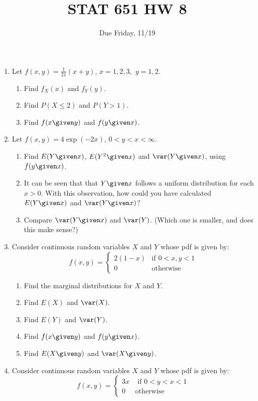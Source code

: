 \documentclass[12pt]{article}
\begin{document}
\title{STAT 651 HW 8}
\author{Due Friday, 11/19}
\date{}
\maketitle

\begin{enumerate}
\item Let $f(x,y) = \frac{1}{21}(x+y)$, $x=1,2,3,$ $y=1,2$.
 \begin{enumerate}
 \item Find $f_X(x)$ and $f_Y(y)$.
 \item Find $P(X\le 2)$ and $P(Y>1)$.
 \item Find $f(x\given y)$ and $f(y\given x)$.
 \end{enumerate}

\item Let $f(x,y) = 4\exp(-2x)$, $0<y<x<\infty$.
  \begin{enumerate}
  \item Find $E(Y\given x)$, $E(Y^2\given x)$ and $\var(Y\given x)$,
  using $f(y\given x)$.
  \item It can be seen that that $Y\given x$ follows a uniform distribution for each $x>0$.
  With this observation, how could you have calculated $E(Y\given x)$ and
  $\var(Y\given x)$?
  \item Compare $\var(Y\given x)$ and $\var(Y)$.  (Which one is smaller, and does this make sense?)
  \end{enumerate}

\item Consider continuous random variables $X$ and $Y$ whose pdf is given by:
\[
f(x,y) = \begin{cases}
    2(1-x)  & \text{if $0 < x,y < 1$} \\
    0       & \text{otherwise}
    \end{cases}
\]

  \begin{enumerate}
  \item Find the marginal distributions for $X$ and $Y$.
  \item Find $E(X)$ and $\var(X)$.
  \item Find $E(Y)$ and $\var(Y)$.
  \item Find $f(x\given y)$ and $f(y\given x)$.
  \item Find $E(X\given y)$ and $\var(X\given y)$.
  \end{enumerate}

\item Consider continuous random variables $X$ and $Y$ whose pdf is given by:
$$f(x,y) = \left\{ \begin{array}{ll}
3x & {\mbox{ if }} 0 < y < x < 1 \\
 0 & {\mbox{otherwise}} \end{array}\right.$$


\end{enumerate}
\end{document}
